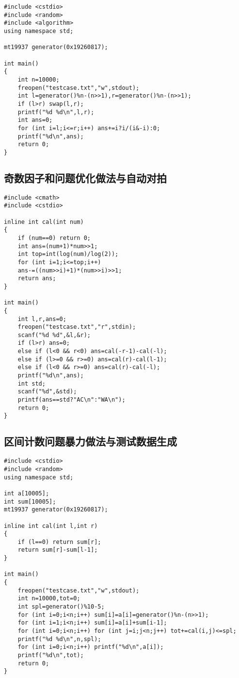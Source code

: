\documentclass{article}
\begin{document}
\begin{lstlisting}
#include <cstdio>
#include <random>
#include <algorithm>
using namespace std;

mt19937 generator(0x19260817);

int main()
{
	int n=10000;
	freopen("testcase.txt","w",stdout);
	int l=generator()%n-(n>>1),r=generator()%n-(n>>1);
	if (l>r) swap(l,r);
	printf("%d %d\n",l,r);
	int ans=0;
	for (int i=l;i<=r;i++) ans+=i?i/(i&-i):0;
	printf("%d\n",ans);
	return 0;
}
\end{lstlisting}

\subsection{奇数因子和问题优化做法与自动对拍}

\begin{lstlisting}
#include <cmath>
#include <cstdio>

inline int cal(int num)
{
	if (num==0) return 0;
	int ans=(num+1)*num>>1;
	int top=int(log(num)/log(2));
	for (int i=1;i<=top;i++)
	ans-=((num>>i)+1)*(num>>i)>>1;
	return ans;
}

int main()
{
	int l,r,ans=0;
	freopen("testcase.txt","r",stdin);
	scanf("%d %d",&l,&r);
	if (l>r) ans=0;
	else if (l<0 && r<0) ans=cal(-r-1)-cal(-l);
	else if (l>=0 && r>=0) ans=cal(r)-cal(l-1);
	else if (l<0 && r>=0) ans=cal(r)-cal(-l);
	printf("%d\n",ans);
	int std;
	scanf("%d",&std);
	printf(ans==std?"AC\n":"WA\n");
	return 0;
}
\end{lstlisting}

\subsection{区间计数问题暴力做法与测试数据生成}

\begin{lstlisting}
#include <cstdio>
#include <random>
using namespace std;

int a[10005];
int sum[10005];
mt19937 generator(0x19260817);

inline int cal(int l,int r)
{
	if (l==0) return sum[r];
	return sum[r]-sum[l-1];
}

int main()
{
	freopen("testcase.txt","w",stdout);
	int n=10000,tot=0;
	int spl=generator()%10-5;
	for (int i=0;i<n;i++) sum[i]=a[i]=generator()%n-(n>>1);
	for (int i=1;i<n;i++) sum[i]=a[i]+sum[i-1];
	for (int i=0;i<n;i++) for (int j=i;j<n;j++) tot+=cal(i,j)<=spl;
	printf("%d %d\n",n,spl);
	for (int i=0;i<n;i++) printf("%d\n",a[i]);
	printf("%d\n",tot);
	return 0;
}
\end{lstlisting}
\end{document}
